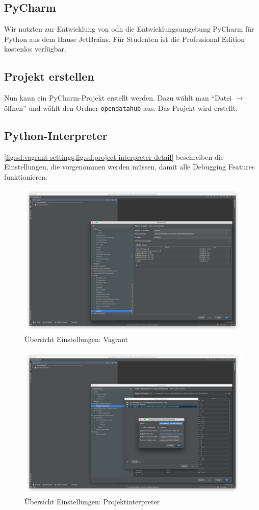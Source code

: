 \subsection{PyCharm}
Wir nutzten zur Entwicklung von \acl{odh} die Entwicklungsumgebung PyCharm für Python aus dem Hause JetBrains. Für Studenten ist die Professional Edition kostenlos verfügbar.

\subsection{Projekt erstellen}
Nun kann ein PyCharm-Projekt erstellt werden. Dazu wählt man ``Datei $\to$ öffnen'' und wählt den Ordner \texttt{opendatahub} aus. Das Projekt wird erstellt. 

\subsection{Python-Interpreter}
\cref{fig:sd:vagrant-settings,fig:sd:project-interpreter-detail} beschreiben die Einstellungen, die vorgenommen werden müssen, damit alle Debugging Features funktionieren.
\begin{figure}[H]
	\centering
	\includegraphics[width=0.8\linewidth]{fig/vagrant_settings}
	\caption{Übersicht Einstellungen: Vagrant}
	\label{fig:sd:vagrant-settings}
\end{figure}
\begin{figure}[H]
	\centering
	\includegraphics[width=0.8\linewidth]{fig/project_interpreter_detail}
	\caption{Übersicht Einstellungen: Projektinterpreter}
	\label{fig:sd:project-interpreter-detail}
\end{figure}



